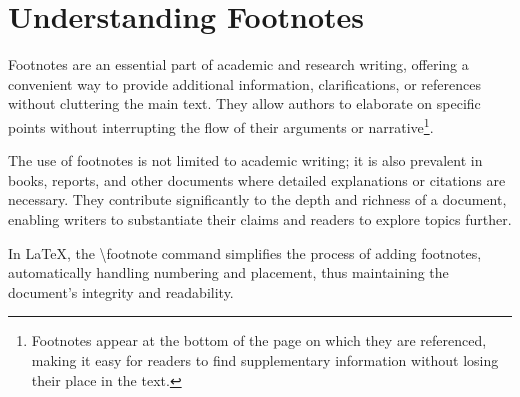 \section{Understanding Footnotes}

Footnotes are an essential part of academic and research writing, offering a convenient way to provide additional information, clarifications, or references without cluttering the main text. They allow authors to elaborate on specific points without interrupting the flow of their arguments or narrative\footnote{Footnotes appear at the bottom of the page on which they are referenced, making it easy for readers to find supplementary information without losing their place in the text.}.

The use of footnotes is not limited to academic writing; it is also prevalent in books, reports, and other documents where detailed explanations or citations are necessary. They contribute significantly to the depth and richness of a document, enabling writers to substantiate their claims and readers to explore topics further.

In LaTeX, the \textbackslash{}footnote command simplifies the process of adding footnotes, automatically handling numbering and placement, thus maintaining the document's integrity and readability.
